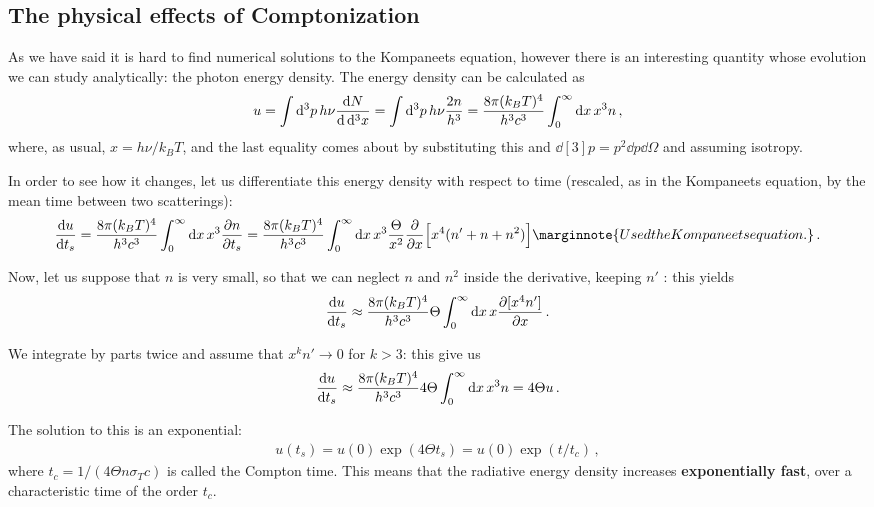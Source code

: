 \documentclass[main.tex]{subfiles}
\begin{document}
\subsection{The physical effects of Comptonization}


As we have said it is hard to find numerical solutions to the Kompaneets equation, however there is an interesting quantity whose evolution we can study analytically: the photon energy density. 
The energy density can be calculated as 
%
\begin{align}
u = \int \dd[3]{p} h \nu \dv{N}{ \dd[3]{x}}
= \int \dd[3]{p} h \nu   \frac{2 n}{h^3} 
= \frac{8 \pi (k_B T)^{4}}{h^3c^3} \int_0^{\infty } \dd{x} x^3 n
\,,
\end{align}
%
where, as usual, \(x = h \nu / k_B T\), and the last equality comes about by substituting this and \(\dd[3]{p} = p^2 \dd{p} \dd{\Omega }\) and assuming isotropy. 

In order to see how it changes, let us differentiate this energy density with respect to time (rescaled, as in the Kompaneets equation, by the mean time between two scatterings): 
%
\begin{align}
\dv{u}{t_s} 
= \frac{8 \pi (k_B T)^{4}}{h^3c^3} \int_0^{\infty } \dd{x} x^3 \pdv{n}{t_s}
= \frac{8 \pi (k_B T)^{4}}{h^3c^3} \int_0^{\infty } \dd{x} x^3 \frac{\Theta}{x^2} \pdv{}{x} \qty[x^{4 } (n' + n + n^2)]
\marginnote{Used the Kompaneets equation.}
\,.
\end{align}

Now, let us suppose that \(n\) is very small, so that we can neglect \(n\) and \(n^2\) inside the derivative, keeping \(n'\)
: this yields 
%
\begin{align}
\dv{u}{t_s} \approx \frac{8 \pi (k_B T)^{4}}{h^3 c^3} \Theta \int_0^{\infty } \dd{x} x \pdv{[x^{4} n']}{x}
\,.
\end{align}

We integrate by parts twice and assume that \(x^{k} n' \to 0 \) for \(k> 3\): this give us 
%
\begin{align}
\dv{u}{t_s} \approx \frac{8 \pi (k_B T)^{4}}{h^3 c^3} 4 \Theta \int_0^{\infty } \dd{x} x^3 n = 4 \Theta u
\,.
\end{align}

The solution to this is an exponential: 
%
\begin{align}
u(t_s) = u(0 ) \exp( 4 \Theta t_s) = u(0 ) \exp( t / t_c )
\,,
\end{align}
%
where \(t_c = 1/ (4 \Theta n \sigma _T c)\) is called the Compton time. 
This means that the radiative energy density increases \textbf{exponentially fast}, over a characteristic time of the order \(t_c\). 
\end{document}
